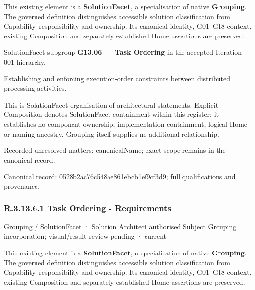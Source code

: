 This existing element is a \textbf{SolutionFacet}, a specialisation of native
\textbf{Grouping}. The \href{\detokenize{../../../../../../../governance/continuum-representation.md#solutionfacet-classification--1119-candidate}}{governed definition}
distinguishes accessible solution classification from Capability, responsibility
and ownership. Its canonical identity, G01–G18 context, existing Composition
and separately established Home assertions are preserved.



SolutionFacet subgroup \textbf{G13.06 — Task Ordering} in the accepted Iteration 001 hierarchy.



Establishing and enforcing execution-order constraints between distributed processing activities.



This is SolutionFacet organisation of architectural statements. Explicit Composition denotes SolutionFacet containment within this register; it establishes no component ownership, implementation containment, logical Home or naming ancestry. Grouping itself supplies no additional relationship.


{\small Recorded unresolved matters: canonicalName; exact scope remains in the canonical record.}\par
{\footnotesize \href{../../../../../../../continuum/grouping/0528b2ac76c548ae861ebcb1ef9cf3d9.md}{Canonical record: 0528b2ac76c548ae861ebcb1ef9cf3d9}; full qualifications and provenance.}\par
\subsubsection*{R.3.13.6.1 Task Ordering - Requirements}
\label{navigation:R.3.13.6.1}

\label{element:5e7bdebc353e49259113adf2a5b93aad}
{\small Grouping / SolutionFacet · Solution Architect authorised Subject Grouping incorporation; visual/result review pending · current}\par

This existing element is a \textbf{SolutionFacet}, a specialisation of native
\textbf{Grouping}. The \href{\detokenize{../../../../../../../governance/continuum-representation.md#solutionfacet-classification--1119-candidate}}{governed definition}
distinguishes accessible solution classification from Capability, responsibility
and ownership. Its canonical identity, G01–G18 context, existing Composition
and separately established Home assertions are preserved.



